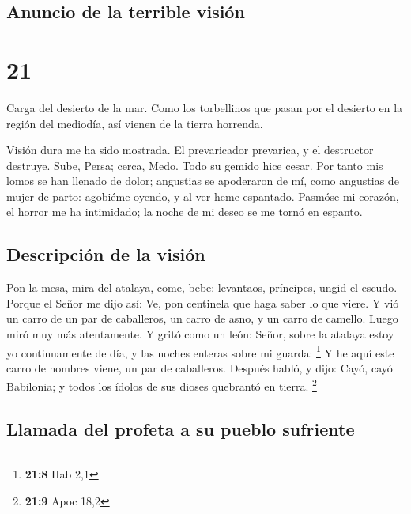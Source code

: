 \hypertarget{anuncio-de-la-terrible-visiuxf3n}{%
\subsection{Anuncio de la terrible
visión}\label{anuncio-de-la-terrible-visiuxf3n}}

\hypertarget{section-20}{%
\section{21}\label{section-20}}

 Carga del desierto de la mar. Como los torbellinos que
pasan por el desierto en la región del mediodía, así vienen de la tierra
horrenda.

 Visión dura me ha sido mostrada. El prevaricador
prevarica, y el destructor destruye. Sube, Persa; cerca, Medo. Todo su
gemido hice cesar.  Por tanto mis lomos se han llenado de
dolor; angustias se apoderaron de mí, como angustias de mujer de parto:
agobiéme oyendo, y al ver heme espantado.  Pasmóse mi
corazón, el horror me ha intimidado; la noche de mi deseo se me tornó en
espanto.

\hypertarget{descripciuxf3n-de-la-visiuxf3n}{%
\subsection{Descripción de la
visión}\label{descripciuxf3n-de-la-visiuxf3n}}

 Pon la mesa, mira del atalaya, come, bebe: levantaos,
príncipes, ungid el escudo.  Porque el Señor me dijo así:
Ve, pon centinela que haga saber lo que viere.  Y vió un
carro de un par de caballeros, un carro de asno, y un carro de camello.
Luego miró muy más atentamente.  Y gritó como un león:
Señor, sobre la atalaya estoy yo continuamente de día, y las noches
enteras sobre mi guarda: \footnote{\textbf{21:8} Hab 2,1} 
Y he aquí este carro de hombres viene, un par de caballeros. Después
habló, y dijo: Cayó, cayó Babilonia; y todos los ídolos de sus dioses
quebrantó en tierra. \footnote{\textbf{21:9} Apoc 18,2}

\hypertarget{llamada-del-profeta-a-su-pueblo-sufriente}{%
\subsection{Llamada del profeta a su pueblo
sufriente}\label{llamada-del-profeta-a-su-pueblo-sufriente}}

